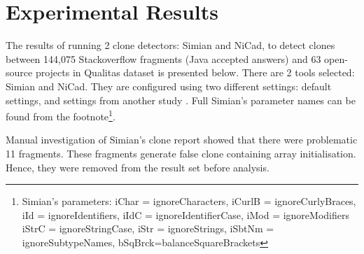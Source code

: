 \documentclass{IEEEtran}
\begin{document}
\section*{Experimental Results}
The results of running 2 clone detectors: Simian and NiCad, to detect clones between 144,075 Stackoverflow fragments (Java accepted answers) and 63 open-source projects in Qualitas dataset is presented below. There are 2 tools selected: Simian and NiCad. They are configured using two different settings: default settings, and settings from another study \cite{Wang2013}. Full Simian's parameter names can be found from the footnote\footnote{Simian's parameters: iChar = ignoreCharacters, iCurlB = ignoreCurlyBraces, iId = ignoreIdentifiers, iIdC = ignoreIdentifierCase, iMod = ignoreModifiers \newline iStrC = ignoreStringCase, iStr = ignoreStrings, iSbtNm = ignoreSubtypeNames, bSqBrck=balanceSquareBrackets}. 

Manual investigation of Simian's clone report showed that there were problematic 11 fragments. These fragments generate false clone containing array initialisation. Hence, they were removed from the result set before analysis.
\end{document}
